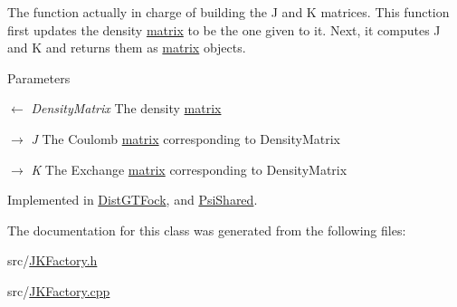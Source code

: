The function actually in charge of building the J and K matrices. This function first updates the density \hyperlink{classJKBuilder_1_1matrix}{matrix} to be the one given to it. Next, it computes J and K and returns them as \hyperlink{classJKBuilder_1_1matrix}{matrix} objects.


\begin{DoxyParams}{Parameters}
\item[\mbox{$\leftarrow$} {\em DensityMatrix}]The density \hyperlink{classJKBuilder_1_1matrix}{matrix} \item[\mbox{$\rightarrow$} {\em J}]The Coulomb \hyperlink{classJKBuilder_1_1matrix}{matrix} corresponding to DensityMatrix \item[\mbox{$\rightarrow$} {\em K}]The Exchange \hyperlink{classJKBuilder_1_1matrix}{matrix} corresponding to DensityMatrix \end{DoxyParams}


Implemented in \hyperlink{classGTFock_1_1DistGTFock_aea85d0b3d84e8e52819e8a15201e078a}{DistGTFock}, and \hyperlink{classJKBuilder_1_1PsiShared_aa5f73a8109ec88464262262164feda1e}{PsiShared}.

The documentation for this class was generated from the following files:\begin{DoxyCompactItemize}
\item 
src/\hyperlink{JKFactory_8h}{JKFactory.h}\item 
src/\hyperlink{JKFactory_8cpp}{JKFactory.cpp}\end{DoxyCompactItemize}
